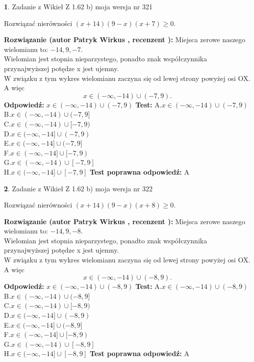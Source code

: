 \documentclass[12pt, a4paper]{article}
\theoremstyle{definition} %
\newtheorem{zad}{}
\newcommand{\zadStart}[1]{\begin{zad}#1\newline}
\newcommand{\zadStop}{\end{zad}}
\newcommand{\rozwStart}[2]{\noindent \textbf{Rozwiązanie (autor #1 , recenzent #2): }\newline}
\newcommand{\rozwStop}{\newline}
\newcommand{\odpStart}{\noindent \textbf{Odpowiedź:}\newline}
\newcommand{\odpStop}{\newline}
\newcommand{\testStart}{\noindent \textbf{Test:}\newline}
\newcommand{\testStop}{\newline}
\newcommand{\kluczStart}{\noindent \textbf{Test poprawna odpowiedź:}\newline}
\newcommand{\kluczStop}{\newline}
\begin{document}
\zadStart{Zadanie z Wikieł Z 1.62 b) moja wersja nr 321}

Rozwiązać nierówności $(x+14)(9-x)(x+7)\ge0$.
\zadStop
\rozwStart{Patryk Wirkus}{}
Miejsca zerowe naszego wielomianu to: $-14, 9, -7$.\\
Wielomian jest stopnia nieparzystego, ponadto znak współczynnika przy\linebreak najwyższej potędze x jest ujemny.\\ W związku z tym wykres wielomianu zaczyna się od lewej strony powyżej osi OX. A więc $$x \in (-\infty,-14) \cup (-7,9).$$
\rozwStop
\odpStart
$x \in (-\infty,-14) \cup (-7,9)$
\odpStop
\testStart
A.$x \in (-\infty,-14) \cup (-7,9)$\\
B.$x \in (-\infty,-14) \cup (-7,9]$\\
C.$x \in (-\infty,-14) \cup [-7,9)$\\
D.$x \in (-\infty,-14] \cup (-7,9)$\\
E.$x \in (-\infty,-14] \cup (-7,9]$\\
F.$x \in (-\infty,-14] \cup [-7,9)$\\
G.$x \in (-\infty,-14) \cup [-7,9]$\\
H.$x \in (-\infty,-14] \cup [-7,9]$
\testStop
\kluczStart
A
\kluczStop



\zadStart{Zadanie z Wikieł Z 1.62 b) moja wersja nr 322}

Rozwiązać nierówności $(x+14)(9-x)(x+8)\ge0$.
\zadStop
\rozwStart{Patryk Wirkus}{}
Miejsca zerowe naszego wielomianu to: $-14, 9, -8$.\\
Wielomian jest stopnia nieparzystego, ponadto znak współczynnika przy\linebreak najwyższej potędze x jest ujemny.\\ W związku z tym wykres wielomianu zaczyna się od lewej strony powyżej osi OX. A więc $$x \in (-\infty,-14) \cup (-8,9).$$
\rozwStop
\odpStart
$x \in (-\infty,-14) \cup (-8,9)$
\odpStop
\testStart
A.$x \in (-\infty,-14) \cup (-8,9)$\\
B.$x \in (-\infty,-14) \cup (-8,9]$\\
C.$x \in (-\infty,-14) \cup [-8,9)$\\
D.$x \in (-\infty,-14] \cup (-8,9)$\\
E.$x \in (-\infty,-14] \cup (-8,9]$\\
F.$x \in (-\infty,-14] \cup [-8,9)$\\
G.$x \in (-\infty,-14) \cup [-8,9]$\\
H.$x \in (-\infty,-14] \cup [-8,9]$
\testStop
\kluczStart
A
\kluczStop
\end{document}
